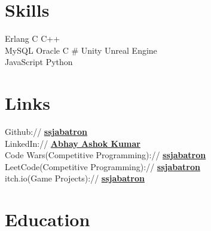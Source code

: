 \documentclass[]{deedy-resume-openfont}
\begin{document}
%
%
\lastupdated

%
%

%
%

\begin{minipage}[t]{0.33\textwidth} 


\section{Skills}
Erlang \textbullet{}   C \textbullet{} C++\\ 
MySQL \textbullet{} Oracle \textbullet{} C \# \textbullet{} Unity \textbullet{} Unreal Engine \\
 \textbullet{} JavaScript \textbullet{} Python
\sectionsep



\section{Links} 
Github:// \href{https://github.com/SSJAbatron}{\bf ssjabatron} \\
LinkedIn://  \href{https://www.linkedin.com/in/abhay-ashok-kumar-7b685bb3}{\bf Abhay Ashok Kumar} \\
Code Wars(Competitive Programming)://  \href{https://www.codewars.com/users/SSJAbatron}{\bf ssjabatron} \\
LeetCode(Competitive Programming)://  \href{https://leetcode.com/SSJAbatron/}{\bf ssjabatron} \\
itch.io(Game Projects)://  \href{https://ssjabatron.itch.io}{\bf ssjabatron}
\vspace{\topsep} %

\section{Education} 
\vspace{\topsep} %

\end{minipage}
\end{document}
